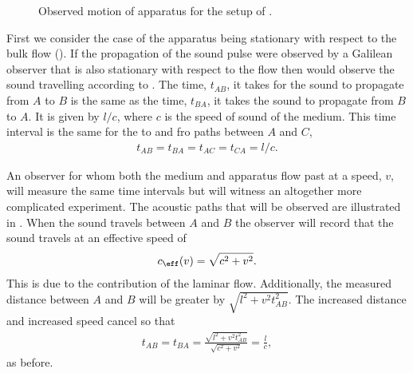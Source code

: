  \begin{figure}[t]
      \centering
\hspace{2cm}
\label{fig:GalileanA}
      \caption{Observed motion of apparatus for the setup of .}
 \end{figure}

First we consider the case of the apparatus being stationary with respect to the bulk flow ().
If the propagation of the sound pulse were observed by a Galilean observer that is also stationary with respect to the flow
then \she would observe the sound travelling according to .
The time, $t_{AB}$,  it takes for the sound to propagate from $A$ to $B$ is the same as the time, $t_{BA}$, it takes the sound to propagate from $B$ to $A$.
It is given by $l/c$, where  $c$ is the speed of sound of the medium.
This time interval is the same for the to and fro paths between $A$ and $C$,
\begin{align}
  t_{AB}=t_{BA}=t_{AC}=t_{CA}=l/c\label{eqn:setupA:stationary:Tab}.
\end{align}

An observer for whom  both the medium and apparatus flow past at a speed, $v$, will measure the same time intervals 
but will witness an altogether more complicated experiment.
The acoustic paths that will be observed are illustrated in .
When the sound travels between $A$ and $B$ the observer will record that the sound travels at an effective speed of
\begin{align}
\label{eqn:ceffone}
c_\eff(v) = \sqrt{c^2 +v^2}.
\end{align}
This is due to  the  contribution of the  laminar flow.
Additionally, the measured distance between $A$ and $B$ will be greater by  $\sqrt{l^2+v^2t_{AB}^2}$.
The increased distance and increased speed cancel so that 
\begin{align}
  \label{eqn:setupA:moving:Tab}
  t_{AB} = t_{BA} = \frac{\sqrt{l^2+v^2t_{AB}^2}}{\sqrt{c^2 +v^2}} = \frac{l}{c},
\end{align}
as before.

